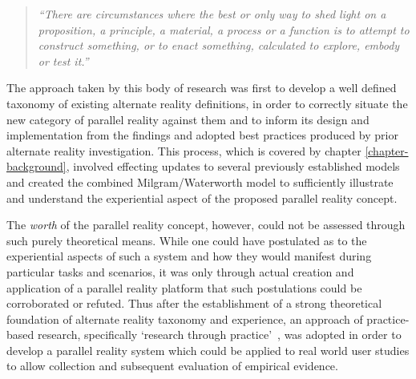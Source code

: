 \begin{quote}
	\textit{``There are circumstances where the best or only way to shed light on a proposition, a principle, a material, a process or a function is to attempt to construct something, or to enact something, calculated to explore, embody or test it.''}~\cite{Archer1995}
\end{quote}


The approach taken by this body of research was first to develop a well defined taxonomy of existing alternate reality definitions, in order to correctly situate the new category of parallel reality against them and to inform its design and implementation from the findings and adopted best practices produced by prior alternate reality investigation. This process, which is covered by chapter \ref{chapter-background}, involved effecting updates to several previously established models and created the combined Milgram/Waterworth model to sufficiently illustrate and understand the experiential aspect of the proposed parallel reality concept.

The \textit{worth} of the parallel reality concept, however, could not be assessed through such purely theoretical means. While one could have postulated as to the experiential aspects of such a system and how they would manifest during particular tasks and scenarios, it was only through actual creation and application of a parallel reality platform that such postulations could be corroborated or refuted. Thus after the establishment of a strong theoretical foundation of alternate reality taxonomy and experience, an approach of practice-based research, specifically `research through practice'~\cite{Chynoweth2014}, was adopted in order to develop a parallel reality system which could be applied to real world user studies to allow collection and subsequent evaluation of empirical evidence.

